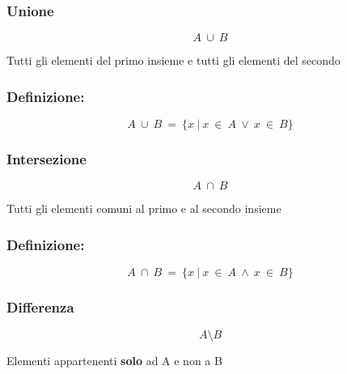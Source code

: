     \subsubsection{Unione}
        \begin{LARGE}
            \begin{equation*}
                A\ \cup\ B
            \end{equation*}
        \end{LARGE}
        Tutti gli elementi del primo insieme e tutti gli elementi del secondo\newline
        
        \subsubsection*{Definizione:}
        
        \begin{LARGE}
            \begin{equation*}
                A\ \cup\ B\ =\ \{x\ |\ x\ \in\ A\ \vee\ x\ \in\ B\}
            \end{equation*}
        \end{LARGE}

        \subsubsection{Intersezione}
        \begin{LARGE}
            \begin{equation*}
                A\ \cap\ B
            \end{equation*}
        \end{LARGE}
        Tutti gli elementi comuni al primo e al secondo insieme\newline
        
        \subsubsection*{Definizione:}
        
        \begin{LARGE}
            \begin{equation*}
                A\ \cap\ B\ =\ \{x\ |\ x\ \in\ A\ \land\ x\ \in\ B\}
            \end{equation*}
        \end{LARGE}

        \subsubsection{Differenza}
        \begin{LARGE}
            \begin{equation*}
                A \setminus B
            \end{equation*}
        \end{LARGE}
        Elementi appartenenti \textbf{solo} ad A e non a B\newline
        
